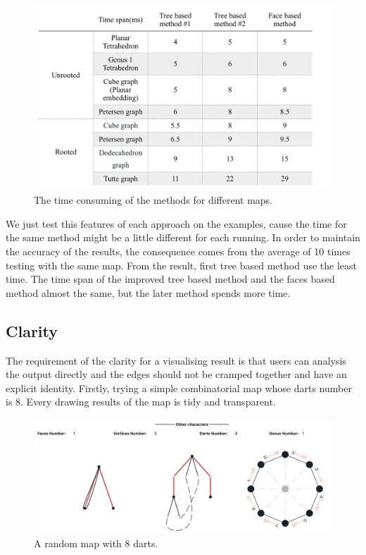   \begin{figure}[htb]
    \centering
    \includegraphics[width=1\textwidth]{../../image/timeconsume.png}
    \caption{The time consuming of the methods for different maps.}
    \label{fig:figures:timeconsume}
  \end{figure}
  We just test this features of each approach on the examples, cause the time for the same method might be a little different for each running. In order to maintain the accuracy of the results, the consequence comes from the average of 10 times testing with the same map. From the result, first tree based method use the least time.  The time span of the improved tree based method and the faces based method almost the same, but the later method spends more time.

  \subsection{Clarity}
  The requirement of the clarity for a visualising result is that users can analysis the output directly and the edges should not be cramped together and have an explicit identity. Firstly, trying a simple combinatorial map whose darts number is 8. Every drawing results of the map is tidy and transparent.
  \begin{figure}[htb]
    \centering
    \includegraphics[width=1\textwidth]{../../image/clear1.png}
    \caption{A random map with 8 darts.}
    \label{fig:figures:clear1}
  \end{figure}

